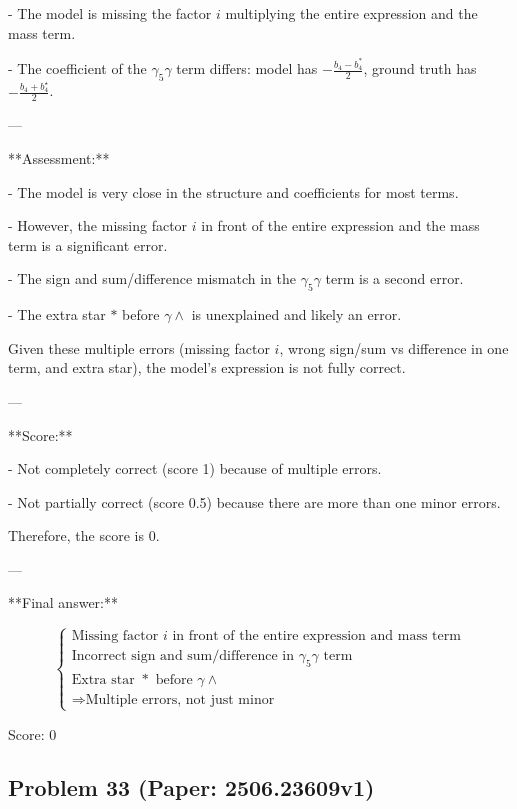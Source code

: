 \documentclass[10pt]{article}
\begin{document}
- The model is missing the factor \(i\) multiplying the entire expression and the mass term.

- The coefficient of the \(\gamma_5 \gamma\) term differs: model has \(- \frac{b_4 - b_4^*}{2}\), ground truth has \(- \frac{b_4 + b_4^\star}{2}\).

---

**Assessment:**

- The model is very close in the structure and coefficients for most terms.

- However, the missing factor \(i\) in front of the entire expression and the mass term is a significant error.

- The sign and sum/difference mismatch in the \(\gamma_5 \gamma\) term is a second error.

- The extra star \( * \) before \(\gamma \wedge\) is unexplained and likely an error.

Given these multiple errors (missing factor \(i\), wrong sign/sum vs difference in one term, and extra star), the model's expression is not fully correct.

---

**Score:**

- Not completely correct (score 1) because of multiple errors.

- Not partially correct (score 0.5) because there are more than one minor errors.

Therefore, the score is 0.

---

**Final answer:**

\[
\boxed{
\begin{cases}
\text{Missing factor } i \text{ in front of the entire expression and mass term} \\
\text{Incorrect sign and sum/difference in } \gamma_5 \gamma \text{ term} \\
\text{Extra star } * \text{ before } \gamma \wedge \\
\Rightarrow \text{Multiple errors, not just minor}
\end{cases}
}
\]

Score: 0

\newpage
\subsection*{Problem 33 (Paper: 2506.23609v1)}
\end{document}
